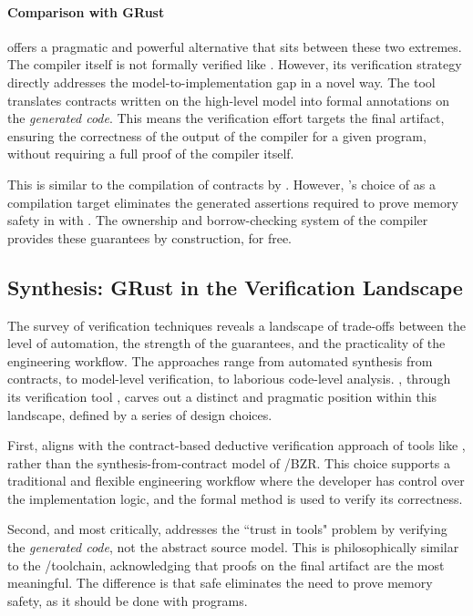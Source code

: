 \paragraph*{Comparison with GRust}
\GRust offers a pragmatic and powerful alternative that sits between these two extremes. The \GRust
compiler itself is not formally verified like \Velus. However, its verification strategy directly
addresses the model-to-implementation gap in a novel way. The \GReusot tool translates contracts
written on the high-level \GRust model into formal annotations on the \emph{generated \Rust code}.
This means the verification effort targets the final artifact, ensuring the correctness of the
output of the compiler for a given program, without requiring a full proof of the compiler itself.

This is similar to the compilation of \FramaC contracts by \LustreC. However, \GRust's choice of
\Rust as a compilation target eliminates the generated assertions required to prove memory safety in
\Ci with \FramaC. The ownership and borrow-checking system of the \Rust compiler provides these
guarantees by construction, for free.

\subsection{Synthesis: GRust in the Verification Landscape}
\label{sec:sota:verification:synthesis}

The survey of verification techniques reveals a landscape of trade-offs between the level of
automation, the strength of the guarantees, and the practicality of the engineering workflow. The
approaches range from automated synthesis from contracts, to model-level verification, to laborious
code-level analysis. \GRust, through its verification tool \GReusot, carves out a distinct and
pragmatic position within this landscape, defined by a series of design choices.

First, \GReusot aligns with the contract-based deductive verification approach of tools like \Kind,
rather than the synthesis-from-contract model of \Heptagon/BZR. This choice supports a traditional
and flexible engineering workflow where the developer has control over the implementation logic, and
the formal method is used to verify its correctness.

Second, and most critically, \GReusot addresses the ``trust in tools" problem by verifying the
\emph{generated code}, not the abstract source model. This is philosophically similar to the
\LustreC/\FramaC toolchain, acknowledging that proofs on the final artifact are the most meaningful.
The difference is that safe \Rust eliminates the need to prove memory safety, as it should be done
with \Ci programs.

